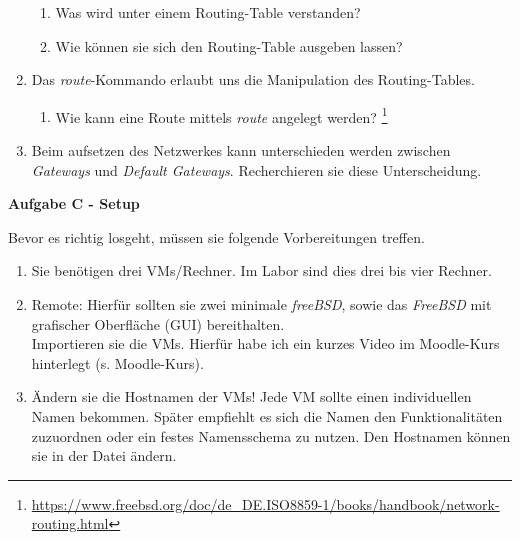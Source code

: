\documentclass[paper=a4,fontsize=11pt]{scrartcl}%
\numberwithin{equation}{section}
\begin{document}
\begin{enumerate}
	\begin{enumerate}
		\item Was wird unter einem Routing-Table verstanden?
		\item Wie können sie sich den Routing-Table ausgeben lassen?
	\end{enumerate}
	\item Das \emph{route}-Kommando erlaubt uns die Manipulation des Routing-Tables.
	\begin{enumerate}
		\item Wie kann eine Route mittels \emph{route} angelegt werden? \footnote{\url{https://www.freebsd.org/doc/de_DE.ISO8859-1/books/handbook/network-routing.html}}
	\end{enumerate}
	\item Beim aufsetzen des Netzwerkes kann unterschieden werden zwischen \emph{Gateways} und \emph{Default Gateways}. Recherchieren sie diese Unterscheidung.
\end{enumerate}

\begin{center}\Large{\textbf{Aufgabe C - Setup}}\end{center}
Bevor es richtig losgeht, müssen sie folgende Vorbereitungen treffen.
\begin{enumerate}
	\item Sie benötigen drei VMs/Rechner. Im Labor sind dies drei bis vier Rechner.
	\item Remote: Hierfür sollten sie zwei minimale \emph{freeBSD}, sowie das \emph{FreeBSD} mit grafischer Oberfläche (GUI) bereithalten. \\
Importieren sie die VMs. Hierfür habe ich ein kurzes Video im Moodle-Kurs hinterlegt (s. Moodle-Kurs).
	\item Ändern sie die Hostnamen der VMs! Jede VM sollte einen individuellen Namen bekommen. Später empfiehlt es sich die Namen den Funktionalitäten zuzuordnen oder ein festes Namensschema zu nutzen. Den Hostnamen können sie in der Datei  ändern.
\end{enumerate}
\end{document}
